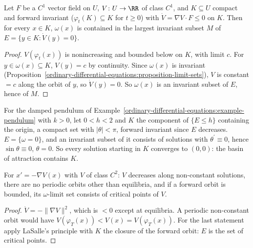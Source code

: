 \begin{theorem}\label{ordinary-differential-equations:theorem-lasalle}
Let $F$ be a $C^1$ vector field on $U$, $V \colon U \to \RR$ of class $C^1$, and $K \subseteq U$ compact and forward invariant ($\varphi_t(K) \subseteq K$ for $t \geq 0$) with $\dot V = \nabla V \cdot F \leq 0$ on $K$. Then for every $x \in K$,
$\omega(x)$ is contained in the largest invariant subset $M$ of $E = \{y \in K : \dot V(y) = 0\}$.
\end{theorem}

\begin{proof}
$V(\varphi_t(x))$ is nonincreasing and bounded below on $K$, with limit $c$. For $y \in \omega(x) \subseteq K$, $V(y) = c$ by continuity. Since $\omega(x)$ is invariant (Proposition~\ref{ordinary-differential-equations:proposition-limit-sets}), $V$ is
constant $= c$ along the orbit of $y$, so $\dot V(y) = 0$. So $\omega(x)$ is an invariant subset of $E$, hence of $M$.
\end{proof}

\begin{example}\label{ordinary-differential-equations:example-lasalle-pendulum}
For the damped pendulum of Example~\ref{ordinary-differential-equations:example-pendulum} with $k > 0$, let $0 < h < 2$ and $K$ the component of $\{E \leq h\}$ containing the origin, a compact set with $|\theta| < \pi$, forward invariant since $E$
decreases. $E = \{\omega = 0\}$, and an invariant subset of it consists of solutions with $\theta^{\prime} \equiv 0$, hence $\sin\theta \equiv 0$, $\theta = 0$. So every solution starting in $K$ converges to $(0, 0)$: the basin of attraction contains
$K$.
\end{example}

\begin{proposition}\label{ordinary-differential-equations:proposition-gradient}
For $x' = -\nabla V(x)$ with $V$ of class $C^2$: $V$ decreases along non-constant solutions, there are no periodic orbits other than equilibria, and if a forward orbit is bounded, its $\omega$-limit set consists of critical points of $V$.
\end{proposition}

\begin{proof}
$\dot V = -\|\nabla V\|^2$, which is $< 0$ except at equilibria. A periodic non-constant orbit would have $V(\varphi_T(x)) < V(x) = V(\varphi_T(x))$. For the last statement apply LaSalle's principle with $K$ the closure of the forward orbit:
$E$ is the set of critical points.
\end{proof}

